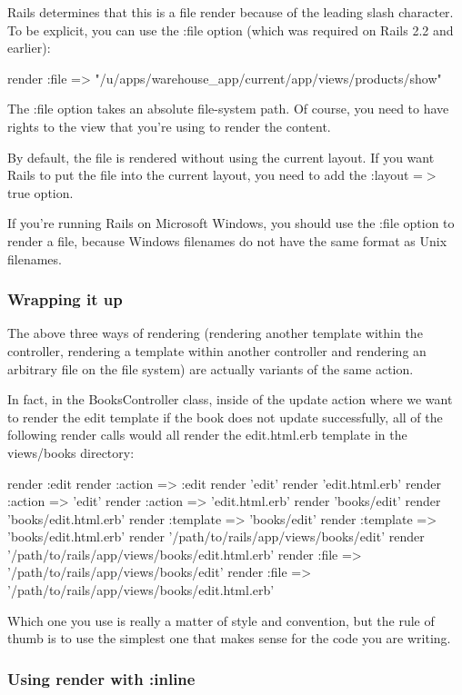 \documentclass[10pt]{book}
\newenvironment{code}{%
  \scriptsize
    \verbatim
}{%
    \endverbatim
    \newline
}
\begin{document}
Rails determines that this is a file render because of the leading slash character. To be explicit, you can use the :file option (which was required on Rails 2.2 and earlier):
\begin{code}
render :file =>
  "/u/apps/warehouse_app/current/app/views/products/show"
\end{code}

The :file option takes an absolute file-system path. Of  course, you need to have rights to the view that you’re using to render  the content.

By default, the file is rendered without using the  current layout. If you want Rails to put the file into the current  layout, you need to add the :layout =$>$ true option.

If you’re running Rails on Microsoft Windows, you should use the :file option to render a file, because Windows filenames do not have the same format as Unix filenames.

\subsubsection{ Wrapping it up}

The above three ways of rendering (rendering another template within  the controller, rendering a template within another controller and  rendering an arbitrary file on the file system) are actually variants of  the same action.

In fact, in the BooksController class, inside of the update action  where we want to render the edit template if the book does not update  successfully, all of the following render calls would all render the edit.html.erb template in the views/books directory:
\begin{code}
render :edit
render :action => :edit
render 'edit'
render 'edit.html.erb'
render :action => 'edit'
render :action => 'edit.html.erb'
render 'books/edit'
render 'books/edit.html.erb'
render :template => 'books/edit'
render :template => 'books/edit.html.erb'
render '/path/to/rails/app/views/books/edit'
render '/path/to/rails/app/views/books/edit.html.erb'
render :file => '/path/to/rails/app/views/books/edit'
render :file => '/path/to/rails/app/views/books/edit.html.erb'
\end{code}

Which one you use is really a matter of style and convention, but the  rule of thumb is to use the simplest one that makes sense for the code  you are writing.

\subsubsection{ Using render with :inline}
\end{document}
